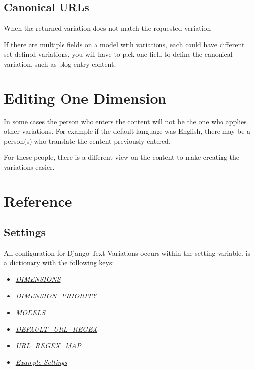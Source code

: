 \documentclass[letterpaper,10pt,english]{sphinxmanual}
\begin{document}
\section{Canonical URLs}
\label{templates:canonical-urls}
When the returned variation does not match the requested variation

If there are multiple fields on a model with variations, each could have different set defined variations, you will have to pick one field to define the canonical variation, such as blog entry content.


\chapter{Editing One Dimension}
\label{editing_one_dimension::doc}\label{editing_one_dimension:editing-one-dimension}
In some cases the person who enters the content will not be the one who applies other variations. For example if the default language was English, there may be a person(s) who translate the content previously entered.

For these people, there is a different view on the content to make creating the variations easier.


\chapter{Reference}
\label{reference/index::doc}\label{reference/index:reference}

\section{Settings}
\label{reference/settings:id1}\label{reference/settings::doc}\label{reference/settings:settings}
All configuration for Django Text Variations occurs within the  setting variable.  is a dictionary with the following keys:
\begin{itemize}
\item {} 
{\hyperref[reference/settings:settings-dimensions]{\emph{DIMENSIONS}}}

\item {} 
{\hyperref[reference/settings:settings-dimension-priority]{\emph{DIMENSION\_PRIORITY}}}

\item {} 
{\hyperref[reference/settings:settings-models]{\emph{MODELS}}}

\item {} 
{\hyperref[reference/settings:settings-default-url-regex]{\emph{DEFAULT\_URL\_REGEX}}}

\item {} 
{\hyperref[reference/settings:settings-url-regex-map]{\emph{URL\_REGEX\_MAP}}}

\item {} 
{\hyperref[reference/settings:settings-example]{\emph{Example Settings}}}

\end{itemize}
\end{document}
